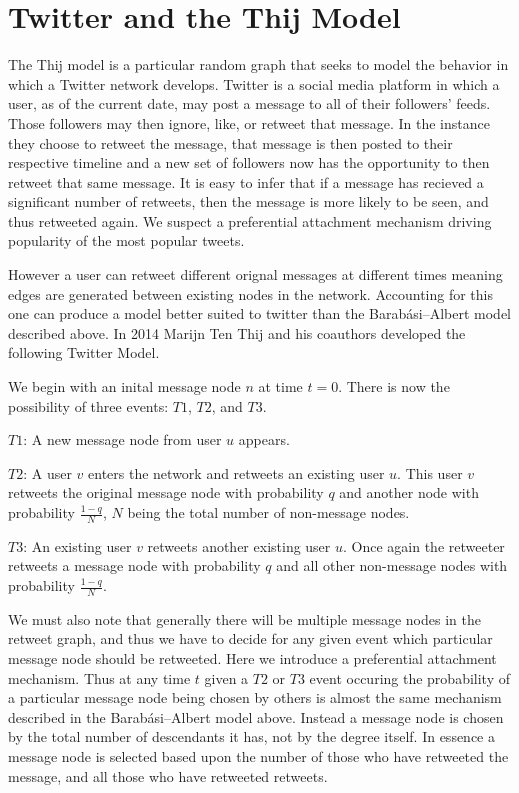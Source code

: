 \chapter{Twitter and the Thij Model}
The Thij model is a particular random graph that seeks to model the behavior in which a Twitter network 
develops. \cite{thij}  Twitter is a social media platform in which a user, as of the current date, may post a message
to all of their followers' feeds. Those followers may then ignore, like, or retweet that message. In the
instance they choose to retweet the message, that message is then posted to their respective timeline and a 
new set of followers now has the opportunity to then retweet that same message. It is easy to infer that if a 
message has recieved a significant number of retweets, then the message is more likely to be seen, and thus
retweeted again. We suspect a preferential attachment mechanism driving popularity of the most popular tweets.

However a user can retweet different orignal messages at different times meaning edges are generated between
existing nodes in the network. Accounting for this one can produce
a model better suited to twitter than the Barabási–Albert model described above. In 2014 Marijn Ten Thij
and his coauthors developed the following Twitter Model.

We begin with an inital message node $n$ at time $t=0$. There is now the possibility of three events: $T1$,
$T2$, and $T3$.

\vspace{3mm}
$T1$: A new message node from user $u$ appears.

\vspace{3mm}
$T2$: A user $v$ enters the network and retweets an existing user $u$. This user $v$ retweets the original message node with 
probability $q$ and another node with probability $\frac{1-q}{N}$, $N$ being the total number of non-message nodes.

\vspace{3mm}
$T3$: An existing user $v$ retweets another existing user $u$. Once again the retweeter retweets a message node with probability 
$q$ and all other non-message nodes with probability $\frac{1-q}{N}$.

\vspace{3mm}

We must also note that generally there will be multiple message nodes in the retweet graph, and thus we have to decide for any given event
which particular message node should be retweeted. Here we introduce a preferential attachment mechanism. Thus at any time $t$
given a $T2$ or $T3$ event occuring the probability of a particular message node being chosen by others is almost the
same mechanism described in the Barabási–Albert model above. Instead a message node is chosen
by the total number of descendants it has, not by the degree itself. In essence a message node
is selected based upon the number of those who have retweeted the message, and all those who have retweeted
retweets. 

